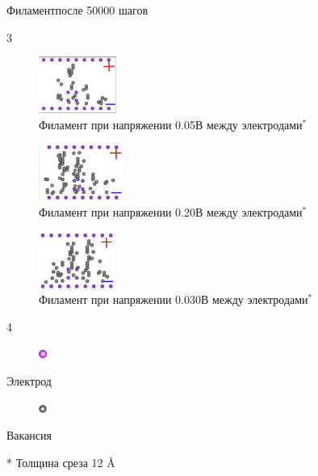 \documentclass{beamer}%
\begin{document}
\begin{frame}{Филамент}{после 50000 шагов}

\begin {multicols} {3}
\begin{figure}

    \centering
    \includegraphics[height=70px]{img/filament/filament__1.jpg}
    \caption{Филамент при напряжении 0.05В между электродами\( ^*\)}
\end{figure}

\columnbreak
\begin{figure}
    \centering
    \includegraphics[height=70px]{img/filament/filament__2.jpg}
    \caption{Филамент при напряжении 0.20В между электродами\( ^*\)}
\end{figure}
\columnbreak
\begin{figure}
    \centering
    \includegraphics[height=70px]{img/filament/filament__3.jpg}
    \caption{Филамент при напряжении 0.030В между электродами\( ^*\)}
\end{figure}
\end {multicols}
\begin {multicols} {4}
\begin{figure}
    \includegraphics[width=10px]{img/filament/electrode.png}
\end{figure} 
\columnbreak
Электрод
\columnbreak
\begin{figure}
    \includegraphics[width=10px]{img/filament/hafnium.png}
\end{figure}

\columnbreak
Вакансия
\end{multicols}
* Толщина среза 12 \r{A}
\end{frame}
\end{document}
